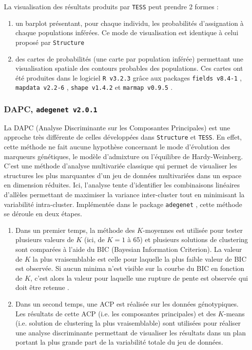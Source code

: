 \documentclass[a4paper,12pt,twoside]{article}\usepackage[]{graphicx}\usepackage[]{color}
\begin{document}
\begin {bibunit} [newbst]
La visualisation des résultats produits par \texttt{TESS} peut prendre 2 formes :
\begin{enumerate}
	\item un barplot présentant, pour chaque individu, les probabilités d'assignation à chaque populations inférées. Ce mode de visualisation est identique à celui proposé par \texttt{Structure}
	\item des cartes de probabilités (une carte par population inférée) permettant une visualisation spatiale des contours probables des populations. Ces cartes ont été produites dans le logiciel \texttt{R~v3.2.3} \citep{rct2015} grâce aux packages \texttt{fields~v8.4-1} \citep{nychka2015}, \texttt{mapdata~v2.2-6} \citep{becker2016}, \texttt{shape~v1.4.2} \citep{soetaert2014} et \texttt{marmap~v0.9.5} \citep{pante2013}.
\end{enumerate}

\subsubsection*{DAPC, \texttt{adegenet~v2.0.1} \citep{jombart2008}}

La DAPC (Analyse Discriminante sur les Composantes Principales) est une approche très différente de celles développées dans \texttt{Structure} et \texttt{TESS}. En effet, cette méthode ne fait aucune hypothèse concernant le mode d'évolution des marqueurs génétiques, le modèle d'admixture ou l'équilibre de Hardy-Weinberg. C'est une méthode d'analyse multivariée classique qui permet de visualiser les structures les plus marquantes d'un jeu de données multivariées dans un espace en dimension réduites. Ici, l'analyse tente d'identifier les combinaisons linéaires d'allèles permettant de maximiser la variance inter-cluster tout en minimisant la variabilité intra-cluster.
Implémentée dans le package \texttt{adegenet} \citep{jombart2008}, cette méthode se déroule en deux étapes.
\begin{enumerate}
	\item Dans un premier temps, la méthode des $K$-moyennes est utilisée pour tester plusieurs valeurs de $K$ (ici, de $K=1$ à 65) et plusieurs solutions de clustering sont comparées à l'aide du BIC (Bayesian Information Criterion). La valeur de $K$ la plus vraisemblable est celle pour laquelle la plus faible valeur de BIC est observée. Si aucun minima n'est visible sur la courbe du BIC en fonction de $K$, c'est alors la valeur pour laquelle une rupture de pente est observée qui doit être retenue \citep{jombart2008}.
	\item Dans un second temps, une ACP est réalisée sur les données génotypiques. Les résultats de cette ACP (i.e. les composantes principales) et des $K$-means (i.e. solution de clustering la plus vraisemblable) sont utilisées pour réaliser une analyse discriminante permettant de visualiser les résultats dans un plan portant la plus grande part de la variabilité totale du jeu de données.\\[1pc]
\end{enumerate}




\end{bibunit}
\end{document}
